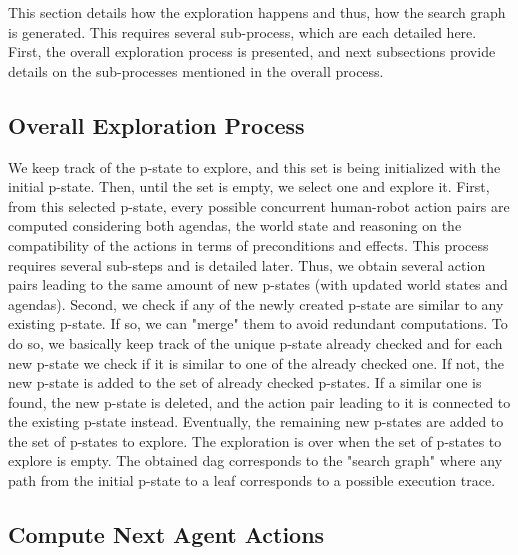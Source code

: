 This section details how the exploration happens and thus, how the search graph is generated. This requires several sub-process, which are each detailed here. First, the overall exploration process is presented, and next subsections provide details on the sub-processes mentioned in the overall process.

    \subsection{Overall Exploration Process}

We keep track of the p-state to explore, and this set is being initialized with the initial p-state. Then, until the set is empty, we select one and explore it.
First, from this selected p-state, every possible concurrent human-robot action pairs are computed considering both agendas, the world state and reasoning on the compatibility of the actions in terms of preconditions and effects. This process requires several sub-steps and is detailed later. Thus, we obtain several action pairs leading to the same amount of new p-states (with updated world states and agendas).
Second, we check if any of the newly created p-state are similar to any existing p-state. If so, we can "merge" them to avoid redundant computations. To do so, we basically keep track of the unique p-state already checked and for each new p-state we check if it is similar to one of the already checked one. 
If not, the new p-state is added to the set of already checked p-states. 
If a similar one is found, the new p-state is deleted, and the action pair leading to it is connected to the existing p-state instead.
Eventually, the remaining new p-states are added to the set of p-states to explore. 
The exploration is over when the set of p-states to explore is empty. The obtained \acrshort{dag} corresponds to the "search graph" where any path from the initial p-state to a leaf corresponds to a possible execution trace.

    \subsection{Compute Next Agent Actions}

